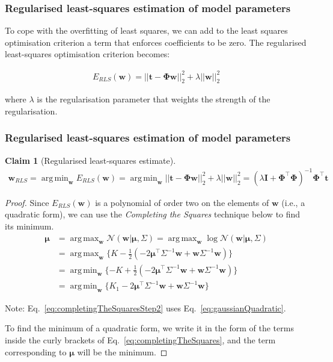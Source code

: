\documentclass[11pt]{beamer}
\newtheorem{claim}{Claim}
\DeclareMathOperator*{\argmax}{arg\,max}
\DeclareMathOperator*{\argmin}{arg\,min}
\begin{document}
\begin{frame}
    \frametitle{Regularised least-squares estimation of model parameters}

    To cope with the overfitting of least squares, we can add to the least
    squares optimisation criterion a term that enforces coefficients to be
    zero. The regularised least-squares optimisation criterion becomes:

    \begin{align*}
        E_{RLS}(\mathbf{w})=||\mathbf{t}-\boldsymbol{\Phi}\mathbf{w}||_2^2+\lambda||\mathbf{w}||_2^2
    \end{align*}

    where $\lambda$ is the regularisation parameter that weights the strength
    of the regularisation.
\end{frame}

\begin{frame}
    \frametitle{Regularised least-squares estimation of model parameters}
	\scriptsize
	\begin{claim}[Regularised least-squares estimate]
		\begin{align*}
			\mathbf{w}_{RLS}=\argmin_{\mathbf{w}}E_{RLS}(\mathbf{w})=\argmin_{\mathbf{w}}||\mathbf{t}-\boldsymbol{\Phi}\mathbf{w}||_2^2+\lambda||\mathbf{w}||_2^2=(\lambda\mathbf{I}+\boldsymbol{\Phi}^\intercal\boldsymbol{\Phi})^{-1}\boldsymbol{\Phi}^\intercal\mathbf{t}
		\end{align*}
	\end{claim}
	\tiny
	\begin{proof}
		Since $E_{RLS}(\mathbf{w})$ is a polynomial of order two on the elements of $\mathbf{w}$ (i.e., a quadratic form), we can use the \emph{Completing the Squares} technique below to find its minimum.
		\begin{align}
			\boldsymbol{\mu}&=\argmax_{\mathbf{w}}\mathcal{N}(\mathbf{w}|\boldsymbol{\mu},\Sigma)=\argmax_{\mathbf{w}}\log\mathcal{N}(\mathbf{w}|\boldsymbol{\mu},\Sigma)\nonumber\\
                            &=\argmax_{\mathbf{w}}\{K-\frac{1}{2}(-2\boldsymbol{\mu}^\intercal\Sigma^{-1}\mathbf{w}+\mathbf{w}\Sigma^{-1}\mathbf{w})\}\label{eq:completingTheSquaresStep2}\\
                            &=\argmin_{\mathbf{w}}\{-K+\frac{1}{2}(-2\boldsymbol{\mu}^\intercal\Sigma^{-1}\mathbf{w}+\mathbf{w}\Sigma^{-1}\mathbf{w})\}\nonumber\\
                            &=\argmin_{\mathbf{w}}\{K_1-2\boldsymbol{\mu}^\intercal\Sigma^{-1}\mathbf{w}+\mathbf{w}\Sigma^{-1}\mathbf{w}\}\label{eq:completingTheSquares}
		\end{align}

		Note: Eq.~\ref{eq:completingTheSquaresStep2} uses Eq.~\ref{eq:gaussianQuadratic}.

		To find the minimum of a quadratic form, we write it in the form of the
terms inside the curly brackets of Eq.~\ref{eq:completingTheSquares}, and the
term corresponding to $\boldsymbol{\mu}$ will be the minimum.

		\phantom\qedhere
	\end{proof}
	\normalsize
\end{frame}
\end{document}
